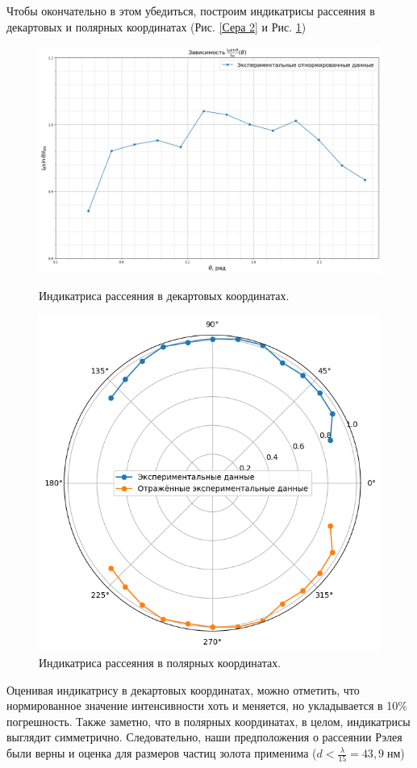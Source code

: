 \documentclass{article}
\begin{document}
Чтобы окончательно в этом убедиться, построим индикатрисы рассеяния в декартовых и полярных координатах (Рис. \ref{Сера 2} и Рис. \ref{Сера 3})
\begin{figure}[!htb] 
        \centering
        \centering
            \includegraphics[width=1\linewidth]{Images/Сера 3.png}
                 \caption{Индикатриса рассеяния в декартовых координатах.}
                 \label{Сера 2}
        \endminipage\hfill
        \centering
             \includegraphics[width=0.69\linewidth]{Images/Сера 2.png}
                 \caption{Индикатриса рассеяния в полярных координатах.}
                 \label{Сера 3}
        \endminipage
\end{figure}

Оценивая индикатрису в декартовых координатах, можно отметить, что нормированное значение интенсивности хоть и меняется, но укладывается в 10\% погрешность. Также заметно, что в полярных координатах, в целом, индикатрисы выглядит симметрично. Следовательно, наши предположения о рассеянии Рэлея были верны и оценка для размеров частиц золота применима ($d < \frac{\lambda}{15} = 43,9 \;\text{нм}$)
\end{document}
